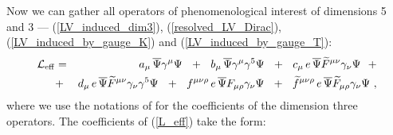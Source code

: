\documentclass[paper,12pt]{revtex4}
\begin{document}
	Now we can gather all operators of phenomenological
	interest of dimensions 5 and 3 --- 
	(\ref{LV_induced_dim3}), (\ref{resolved_LV_Dirac}),
	(\ref{LV_induced_by_gauge_K}) and
	(\ref{LV_induced_by_gauge_T}):
\begin{eqnarray}
\label{L_eff}
	  \mathcal{L}_{\rm eff}
        & = &
        a_\mu\, \overline{\Psi} \gamma^\mu \Psi
	~~+~~
	b_\mu\, \overline{\Psi} \gamma^\mu \gamma^5 \Psi
	~~+~~
	c_\mu\, e\, \overline{\Psi} \widetilde{F}^{\mu\nu}
	                    \gamma_\nu \Psi
        ~~+\\
\nonumber
	& + &
	d_\mu\, e\, \overline{\Psi} \widetilde{F}^{\mu\nu}
	                    \gamma_\nu \gamma^5 \Psi
        ~~+~~
        f^{\mu\nu\rho}\, 
	     e\, \overline{\Psi} F_{\mu\rho} 
                 \gamma_\nu \Psi
	~~+~~
	\widetilde{f}^{\mu\nu\rho}\,
	     e\, \overline{\Psi} \widetilde{F}_{\mu\rho} 
                 \gamma_\nu \Psi
	~,
\end{eqnarray}
	where we use the notations of 
\cite{Colladay:1998fq}
	for the coefficients of the 
	dimension three operators.
	The coefficients of (\ref{L_eff}) take the form:
\end{document}
